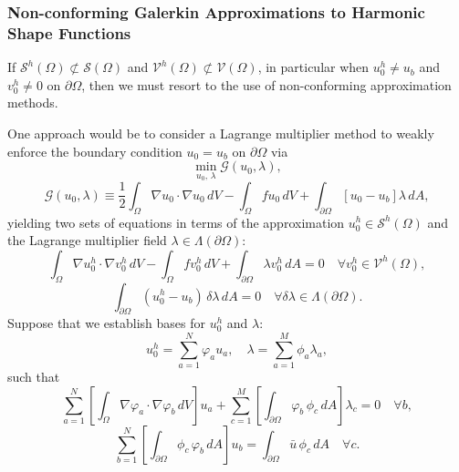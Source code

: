 \subsubsection*{Non-conforming Galerkin Approximations to Harmonic Shape Functions}

	If $\mathcal{S}^h (\Omega) \not\subset \mathcal{S} (\Omega)$ and $\mathcal{V}^h (\Omega) \not\subset \mathcal{V} (\Omega)$, in particular when $u^h_0 \neq u_b$ and $v^h_0 \neq 0$ on $\partial \Omega$, then we must resort to the use of non-conforming approximation methods.
	
	One approach would be to consider a Lagrange multiplier method to weakly enforce the boundary condition $u_0 = u_b$ on $\partial \Omega$ via
	\begin{equation}
		\min_{u_0, \, \lambda} \mathcal{G}(u_0,\lambda),
	\end{equation}
	\begin{equation}
	\mathcal{G}(u_0,\lambda) \equiv \frac{1}{2} \int_{\Omega} \nabla u_0 \cdot \nabla u_0 \, dV - \int_{\Omega} f u_0 \, dV + \int_{\partial \Omega} \left[ u_0 - u_b \right] \lambda \, dA,
\end{equation}
	yielding two sets of equations in terms of the approximation $u^h_0 \in \mathcal{S}^h (\Omega)$ and the Lagrange multiplier field $\lambda \in \Lambda (\partial \Omega)$:
	\begin{equation}
		\int_{\Omega} \nabla u^h_0 \cdot \nabla v^h_0 \, dV - \int_\Omega f v^h_0 \, dV + \int_{\partial \Omega} \lambda v^h_0 \, dA = 0 \quad \forall v^h_0 \in \mathcal{V}^h (\Omega),
	\end{equation}
	\begin{equation}
		\int_{\partial \Omega} (u^h_0 - u_b) \, \delta \lambda \, dA = 0 \quad \forall \delta \lambda \in \Lambda (\partial \Omega).
	\end{equation}
	Suppose that we establish bases for $u^h_0$ and $\lambda$:
\begin{equation}
	u^h_0 = \sum_{a=1}^{N} \varphi_a u_a, \quad \lambda = \sum_{a=1}^{M} \phi_a \lambda_a,
\end{equation}
such that
\begin{equation}
	\sum_{a=1}^N \left[ \int_{\Omega} \nabla \varphi_a \cdot \nabla \varphi_b \, dV \right] u_a + \sum_{c=1}^M \left[ \int_{\partial \Omega} \varphi_b \, \phi_c \, dA \right] \lambda_c = 0 \quad \forall b,
\end{equation}
\begin{equation}
	\sum_{b=1}^N \left[ \int_{\partial \Omega} \phi_c \, \varphi_b \, dA \right] u_b = \int_{\partial \Omega} \bar{u} \, \phi_c \, dA \quad \forall c.
\end{equation}
